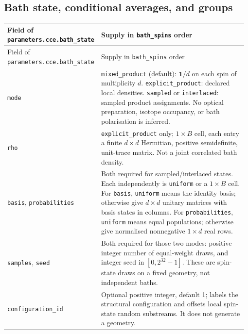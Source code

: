 \documentclass[11pt,a4paper]{article}
\newcommand{\code}[1]{\texttt{#1}}
\begin{document}
\subsection{Bath state, conditional averages, and groups}
\begingroup\small
\begin{longtable}{@{}>{\raggedright\arraybackslash}p{0.335\linewidth}@{\hspace{0.025\linewidth}}>{\raggedright\arraybackslash}p{0.64\linewidth}@{}}
\toprule
Field of \code{parameters.cce.bath\_state} & Supply in \code{bath\_spins} order\\
\midrule\endfirsthead
\toprule
Field of \code{parameters.cce.bath\_state} & Supply in \code{bath\_spins} order\\
\midrule\endhead
\midrule\endfoot
\bottomrule\endlastfoot
\code{mode} & \code{mixed\_product} (default): $\mathbf{1}/d$ on each spin of multiplicity $d$. \code{explicit\_product}: declared local densities. \code{sampled} or \code{interlaced}: sampled product assignments. No optical preparation, isotope occupancy, or bath polarisation is inferred.\\
\code{rho} & \code{explicit\_product} only; $1\times B$ cell, each entry a finite $d\times d$ Hermitian, positive semidefinite, unit-trace matrix. Not a joint correlated bath density.\\
\code{basis}, \code{probabilities} & Both required for sampled/interlaced states. Each independently is \code{uniform} or a $1\times B$ cell. For \code{basis}, \code{uniform} means the identity basis; otherwise give $d\times d$ unitary matrices with basis states in columns. For \code{probabilities}, \code{uniform} means equal populations; otherwise give normalised nonnegative $1\times d$ real rows.\\
\code{samples}, \code{seed} & Both required for those two modes: positive integer number of equal-weight draws, and integer seed in $[0,2^{32}-1]$. These are spin-state draws on a fixed geometry, not independent baths.\\
\code{configuration\_id} & Optional positive integer, default 1; labels the structural configuration and offsets local spin-state random substreams. It does not generate a geometry.\\
\end{longtable}
\endgroup
\end{document}
